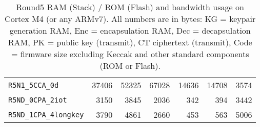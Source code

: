 \documentclass[a4paper]{article}
\begin{document}
\begin{table}
\begin{center}
\begin{tabular}{| l | n{5}{0} n{5}{0} n{5}{0} | n{5}{0} n{5}{0} | n{5}{0} | }
    \verb|R5N1_5CCA_0d|	& 37406 & 52325 & 67028 & 14636 & 14708 & 3574  \\
    \verb|R5ND_0CPA_2iot| & 3150  & 3845 & 2036 & 342   & 394   & 3442  \\
    \verb|R5ND_1CPA_4longkey| & 3790 & 4861 & 2660 & 453 & 563  & 5006  \\
	\hline
	\end{tabular}
	\caption{Round5 RAM (Stack) / ROM (Flash) and bandwidth usage on 
		Cortex M4 (or any ARMv7). All numbers are in bytes: 
		{KG} = keypair generation RAM,	{Enc} = encapsulation RAM, 
		{Dec} = decapsulation RAM,		{PK} = public key (transmit), 
		{CT} ciphertext (transmit), 	{Code} = firmware size excluding 
		Keccak and other standard  components (ROM or Flash).}
	\label{tab:m4size}
\end{center}
\end{table}
\end{document}
